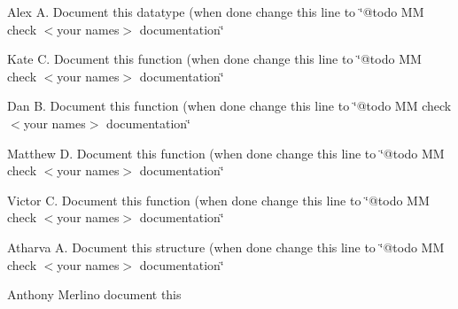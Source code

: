 
\begin{DoxyRefList}
\item[\label{todo__todo000001}%
\hypertarget{todo__todo000001}{}%
global\+Scope$>$ Global \hyperlink{group__receiverlist_ga69666a2f4dbb47a4ffd7b07c252777cf}{char\+Receiver\+\_\+t} )(char)]Alex A. Document this datatype (when done change this line to \char`\"{}@todo M\+M check $<$your names$>$ documentation\char`\"{}  
\item[\label{todo__todo000004}%
\hypertarget{todo__todo000004}{}%
global\+Scope$>$ Global \hyperlink{group__receiverlist_ga08ce6fb053b59a46b55684e3be6c05e8}{Char\+Receiver\+List\+\_\+\+Add} (\hyperlink{structchar_receiver_list__t}{char\+Receiver\+List\+\_\+t} $\ast$r\+List, char\+Receiver\+\_\+t receiver)]Kate C. Document this function (when done change this line to \char`\"{}@todo M\+M check $<$your names$>$ documentation\char`\"{}  
\item[\label{todo__todo000003}%
\hypertarget{todo__todo000003}{}%
global\+Scope$>$ Global \hyperlink{group__receiverlist_ga8cf289548c12196023378e100c54ea7f}{Char\+Receiver\+List\+\_\+\+Init} (\hyperlink{structchar_receiver_list__t}{char\+Receiver\+List\+\_\+t} $\ast$r\+List, char\+Receiver\+\_\+t $\ast$receiver\+\_\+array, uint16\+\_\+t max\+\_\+size)]Dan B. Document this function (when done change this line to \char`\"{}@todo M\+M check $<$your names$>$ documentation\char`\"{}  
\item[\label{todo__todo000005}%
\hypertarget{todo__todo000005}{}%
global\+Scope$>$ Global \hyperlink{group__receiverlist_gafca888b64202be312447e5d1b83ae267}{Char\+Receiver\+List\+\_\+\+Remove} (\hyperlink{structchar_receiver_list__t}{char\+Receiver\+List\+\_\+t} $\ast$r\+List, char\+Receiver\+\_\+t receiver)]Matthew D. Document this function (when done change this line to \char`\"{}@todo M\+M check $<$your names$>$ documentation\char`\"{}  
\item[\label{todo__todo000006}%
\hypertarget{todo__todo000006}{}%
global\+Scope$>$ Global \hyperlink{group__receiverlist_ga11161549092a40b82743d22ee00ad60d}{Char\+Receiver\+List\+\_\+\+Run} (\hyperlink{structchar_receiver_list__t}{char\+Receiver\+List\+\_\+t} $\ast$r\+List, char c)]Victor C. Document this function (when done change this line to \char`\"{}@todo M\+M check $<$your names$>$ documentation\char`\"{}  
\item[\label{todo__todo000002}%
\hypertarget{todo__todo000002}{}%
global\+Scope$>$ Global \hyperlink{group__receiverlist_gaf028d96c57583ae1c99867ab37a4e097}{char\+Receiver\+List\+\_\+t} ]Atharva A. Document this structure (when done change this line to \char`\"{}@todo M\+M check $<$your names$>$ documentation\char`\"{}  
\item[\label{todo__todo000007}%
\hypertarget{todo__todo000007}{}%
File \hyperlink{hal__uart_8h}{hal\+\_\+uart.h} ]Anthony Merlino document this



\end{DoxyRefList}
